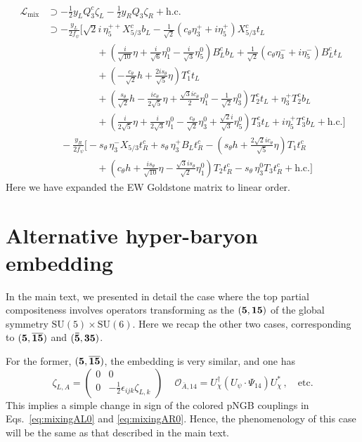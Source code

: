 \documentclass[preprintnumbers,nofootinbib,showpacs,eqsecnum,pre,12pt]{revtex4-1}
\newcommand{\hc}{\text{h.c.}}
\newcommand{\SU}{\text{SU}}
\begin{document}
\begin{align}
    \mathcal L_\mathrm{mix} &\supset - \frac 12y_L  Q_3^c \zeta_L - \frac 12 y_R  Q_3 \zeta_R +\hc \\
    &\supset -\frac{y_L}{2f_\psi}\Bigg[ \sqrt 2i \, \eta_5^{++} X_{5/3}^c b_L - \frac{1}{\sqrt 2} (c_\theta \eta_3^+ +i \eta_5^+) X_{5/3}^c t_L \nonumber \\
	&\qquad\qquad\quad  + \left( \frac{i}{\sqrt{10}} \eta+ \frac{i}{\sqrt{6}} \eta_1^0 - \frac{i}{\sqrt 3} \eta_5^0 \right) B^c_L b_L + \frac{1}{\sqrt{2}} (c_\theta\eta_3^-+ i \eta_5^-) B^c_L t_L\nonumber \\
	&\qquad\qquad\quad + \left( -\frac{c_\theta}{\sqrt2} h+ \frac{2is_\theta}{\sqrt5} \eta \right) T_1^c t_L\nonumber \\
	&\qquad\qquad\quad + \left( \frac{s_\theta}{\sqrt 2} h -\frac{ic_\theta}{2\sqrt 5} \eta + \frac{\sqrt 3ic_\theta}{2} \eta_1^0 -\frac{1}{\sqrt 2}\eta_3^0 \right) T_2^c t_L + \eta_3^+ T_2^c b_L\nonumber \\
	&\qquad\qquad\quad + \left( \frac{i}{2\sqrt5} \eta + \frac{i}{2\sqrt3} \eta_1^0 - \frac{c_\theta}{\sqrt 2} \eta_3^0 + \frac{\sqrt 2i}{\sqrt 3} \eta_5^0 \right) T_3^c t_L + i\eta_5^+ T_3^c b_L +\hc\Bigg]\nonumber  \\
	&\phantom{=}-\frac {y_R}{2f_\psi} \Bigg[ -s_\theta \, \eta_3^- X_{5/3} t_R^c + s_\theta\, \eta_3^+ B_L t_R^c  -\left( s_\theta h +\frac{2\sqrt 2 i c_\theta}{\sqrt 5} \eta \right) T_1 t_R^c \nonumber \\
	&\qquad\qquad \quad +\left( c_\theta h + \frac{is_\theta}{\sqrt{10}} \eta- \frac{\sqrt 3 is_\theta}{\sqrt 2} \eta_1^0  \right) T_2 t_R^c - 	s_\theta\, \eta_3^0 T_3 t_R^c +\hc \Bigg] 
\end{align}
\endgroup
Here we have expanded the EW Goldstone matrix to linear order.


\section{Alternative hyper-baryon embedding}
\label{app:altebb}

In the main text, we presented in detail the case where the top partial compositeness involves operators transforming as the $({\bf 5}, {\bf 15})$ of the global symmetry $\SU(5) \times \SU(6)$. Here we recap the other two cases, corresponding to $({\bf 5}, {\bf \overline{15}})$ and $({\bf \bar 5}, {\bf 35})$.

For the former, $({\bf 5}, {\bf \overline{15}})$, the embedding is very similar, and one has
\begin{equation}
    \zeta_{L,A} = \begin{pmatrix}   0 & 0 \\ 0  & -\frac 12 \epsilon_{ijk} \zeta_{L,k} \end{pmatrix}\, \quad \mathcal{O}_{\bar{A},14} = U_\chi^\dagger (U_\psi \cdot \Psi_{14} ) U_\chi^\ast\,, \quad \mbox{etc.}
\end{equation}
This implies a simple change in sign of the colored pNGB couplings in Eqs.~\eqref{eq:mixingAL0} and \eqref{eq:mixingAR0}. Hence, the phenomenology of this case will be the same as that described in the main text.
\end{document}

